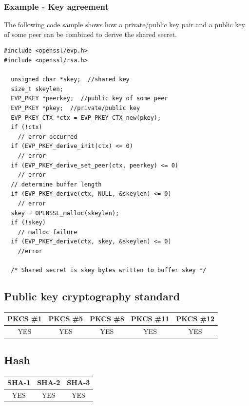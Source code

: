 \subsubsection*{Example - Key agreement}
The following code sample shows how a private/public key pair and a public key of some peer can be combined to derive the shared secret.
\begin{verbatim}
#include <openssl/evp.h>
#include <openssl/rsa.h>

  unsigned char *skey;  //shared key
  size_t skeylen;
  EVP_PKEY *peerkey;  //public key of some peer
  EVP_PKEY *pkey;  //private/public key
  EVP_PKEY_CTX *ctx = EVP_PKEY_CTX_new(pkey);
  if (!ctx)
    // error occurred
  if (EVP_PKEY_derive_init(ctx) <= 0)
    // error
  if (EVP_PKEY_derive_set_peer(ctx, peerkey) <= 0)
    // error
  // determine buffer length
  if (EVP_PKEY_derive(ctx, NULL, &skeylen) <= 0)
    // error
  skey = OPENSSL_malloc(skeylen);
  if (!skey)
    // malloc failure
  if (EVP_PKEY_derive(ctx, skey, &skeylen) <= 0)
    //error
    
  /* Shared secret is skey bytes written to buffer skey */
\end{verbatim}
\newpage

\subsection{Public key cryptography standard}
\begin{table}[!ht]
	\begin{tabular}{|| c | c | c | c | c ||}
		\textbf{PKCS \#1} & \textbf{PKCS \#5} & \textbf{PKCS \#8}  & \textbf{PKCS \#11} & \textbf{PKCS \#12} \\
		\hline \hline
		YES & YES & YES & YES & YES \\
	\end{tabular}
\end{table}

\subsection{Hash}
\begin{table}[!ht]
	\begin{tabular}{|| c | c | c ||}
		\textbf{SHA-1} & \textbf{SHA-2} & \textbf{SHA-3} \\
		\hline \hline
		YES & YES & YES \\
	\end{tabular}
\end{table}

